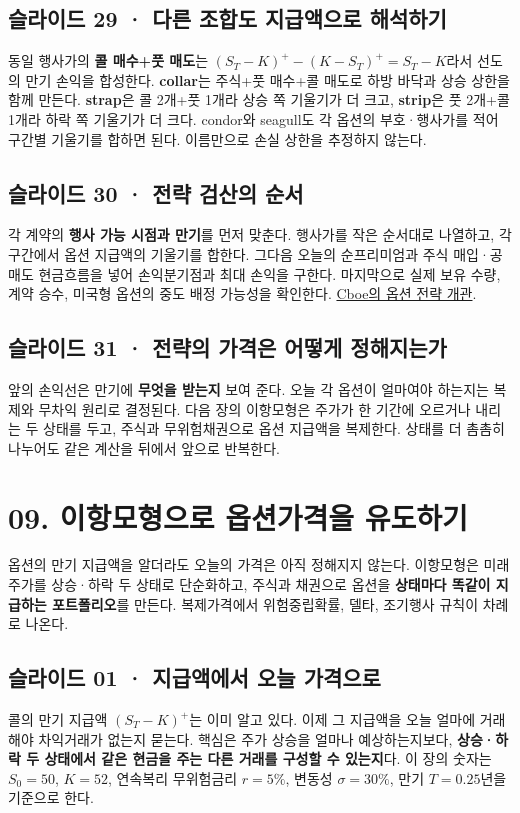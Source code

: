 \documentclass[11pt,a4paper]{article}
\begin{document}
\subsection{슬라이드 29 · 다른 조합도 지급액으로 해석하기}
동일 행사가의 \textbf{콜 매수+풋 매도}는 $(S_T-K)^+-(K-S_T)^+=S_T-K$라서 선도의 만기 손익을 합성한다. \textbf{collar}는 주식+풋 매수+콜 매도로 하방 바닥과 상승 상한을 함께 만든다. \textbf{strap}은 콜 2개+풋 1개라 상승 쪽 기울기가 더 크고, \textbf{strip}은 풋 2개+콜 1개라 하락 쪽 기울기가 더 크다. condor와 seagull도 각 옵션의 부호·행사가를 적어 구간별 기울기를 합하면 된다. 이름만으로 손실 상한을 추정하지 않는다.\par

\subsection{슬라이드 30 · 전략 검산의 순서}
각 계약의 \textbf{행사 가능 시점과 만기}를 먼저 맞춘다. 행사가를 작은 순서대로 나열하고, 각 구간에서 옵션 지급액의 기울기를 합한다. 그다음 오늘의 순프리미엄과 주식 매입·공매도 현금흐름을 넣어 손익분기점과 최대 손익을 구한다. 마지막으로 실제 보유 수량, 계약 승수, 미국형 옵션의 중도 배정 가능성을 확인한다. \href{https://www.cboe.com/optionsinstitute/courses/spread-strategies/}{Cboe의 옵션 전략 개관}.\par

\subsection{슬라이드 31 · 전략의 가격은 어떻게 정해지는가}
앞의 손익선은 만기에 \textbf{무엇을 받는지} 보여 준다. 오늘 각 옵션이 얼마여야 하는지는 복제와 무차익 원리로 결정된다. 다음 장의 이항모형은 주가가 한 기간에 오르거나 내리는 두 상태를 두고, 주식과 무위험채권으로 옵션 지급액을 복제한다. 상태를 더 촘촘히 나누어도 같은 계산을 뒤에서 앞으로 반복한다.\par

\section{09. 이항모형으로 옵션가격을 유도하기}
옵션의 만기 지급액을 알더라도 오늘의 가격은 아직 정해지지 않는다. 이항모형은 미래 주가를 상승·하락 두 상태로 단순화하고, 주식과 채권으로 옵션을 \textbf{상태마다 똑같이 지급하는 포트폴리오}를 만든다. 복제가격에서 위험중립확률, 델타, 조기행사 규칙이 차례로 나온다.\par

\subsection{슬라이드 01 · 지급액에서 오늘 가격으로}
콜의 만기 지급액 $(S_T-K)^+$는 이미 알고 있다. 이제 그 지급액을 오늘 얼마에 거래해야 차익거래가 없는지 묻는다. 핵심은 주가 상승을 얼마나 예상하는지보다, \textbf{상승·하락 두 상태에서 같은 현금을 주는 다른 거래를 구성할 수 있는지}다. 이 장의 숫자는 $S_0=50$, $K=52$, 연속복리 무위험금리 $r=5\%$, 변동성 $\sigma=30\%$, 만기 $T=0.25$년을 기준으로 한다.\par
\end{document}
